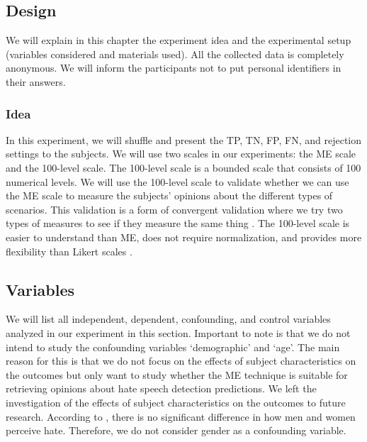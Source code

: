 \documentclass[a4paper]{article}
\begin{document}
\subsection{Design}
We will explain in this chapter the experiment idea and the experimental setup (variables considered and materials used). All the collected data is completely anonymous. We will inform the participants not to put personal identifiers in their answers.

\subsubsection{Idea}
In this experiment, we will shuffle and present the TP, TN, FP, FN, and rejection settings to the subjects. We will use two scales in our experiments: the ME scale and the 100-level scale. The 100-level scale is a bounded scale that consists of 100 numerical levels. We will use the 100-level scale to validate whether we can use the ME scale to measure the subjects' opinions about the different types of scenarios. This validation is a form of convergent validation where we try two types of measures to see if they measure the same thing \cite{fitzner2007reliability}. The 100-level scale is easier to understand than ME, does not require normalization, and provides more flexibility than Likert scales \cite{maddalena2017crowdsourcing}.

\subsection{Variables}
We will list all independent, dependent, confounding, and control variables analyzed in our experiment in this section. Important to note is that we do not intend to study the confounding variables ‘demographic’ and ‘age’. The main reason for this is that we do not focus on the effects of subject characteristics on the outcomes but only want to study whether the ME technique is suitable for retrieving opinions about hate speech detection predictions. We left the investigation of the effects of subject characteristics on the outcomes to future research. According to \cite{gold2018women}, there is no significant difference in how men and women perceive hate. Therefore, we do not consider gender as a confounding variable.
\end{document}
